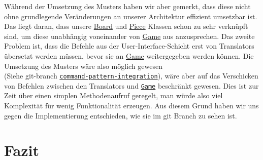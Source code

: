 \documentclass[
10pt, %
a4paper, %
oneside, %
headinclude,footinclude, %
BCOR5mm, %
]{scrartcl}
\begin{document}
\begin{onehalfspace}
Während der Umsetzung des Musters haben wir aber gemerkt, dass diese nicht ohne grundlegende Veränderungen an unserer Architektur effizient umsetzbar ist. Das liegt daran, dass unsere \href{https://github.com/schmida736/Chess-AdvancedSE/blob/main/Chess-AdvancedSE/Game\%20Elements/Board.cs}{Board} und \href{https://github.com/schmida736/Chess-AdvancedSE/blob/main/Chess-AdvancedSE/Game\%20Elements/Pieces/Piece.cs}{Piece} Klassen schon zu sehr verknüpft sind, um diese unabhängig voneinander von \href{https://github.com/schmida736/Chess-AdvancedSE/blob/main/Chess-AdvancedSE/Game\%20Elements/Game.cs}{Game} aus anzusprechen.
Das zweite Problem ist, dass die Befehle aus der User-Interface-Schicht erst von Translators übersetzt werden müssen, bevor sie an \href{https://github.com/schmida736/Chess-AdvancedSE/blob/main/Chess-AdvancedSE/Game\%20Elements/Game.cs}{Game} weitergegeben werden können. Die Umsetzung des Musters wäre also möglich gewesen \\(Siehe git-branch \texttt{\href{https://github.com/schmida736/Chess-AdvancedSE/tree/command-pattern-integration}{command-pattern-integration}}), wäre aber auf das Verschicken von Befehlen zwischen den Translators und \texttt{\href{https://github.com/schmida736/Chess-AdvancedSE/blob/main/Chess-AdvancedSE/Game\%20Elements/Game.cs}{Game}} beschränkt gewesen. Dies ist zur Zeit über einen simplen Methodenaufruf geregelt, man würde also viel Komplexität für wenig Funktionalität erzeugen. Aus diesem Grund haben wir uns gegen die Implementierung entschieden, wie sie im git Branch zu sehen ist.
\newpage
\section{Fazit}
\label{sec:end}


\end{onehalfspace}
\end{document}
